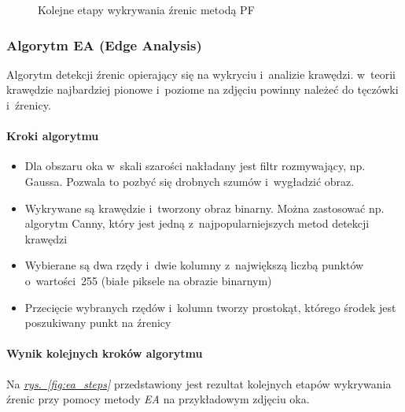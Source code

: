 \begin{figure}[!h]
\begin{center}
    \end{center}
    \caption{Kolejne etapy wykrywania źrenic metodą PF}
    \label{fig:pf_steps}
\end{figure}






\subsubsection{Algorytm EA (Edge Analysis)}

Algorytm detekcji źrenic \cite{EyePupilWebCam} opierający się na wykryciu i~analizie krawędzi. w~teorii krawędzie najbardziej pionowe i~poziome na zdjęciu powinny należeć do tęczówki i~źrenicy.

\paragraph{Kroki algorytmu}

\begin{itemize}
    \item Dla obszaru oka w~skali szarości nakładany jest filtr rozmywający, np. Gaussa. Pozwala to pozbyć się drobnych szumów i~wygładzić obraz.
    \item Wykrywane są krawędzie i~tworzony obraz binarny. Można zastosować np. algorytm Canny, który jest jedną z~najpopularniejszych metod detekcji krawędzi
    \item Wybierane są dwa rzędy i~dwie kolumny z~największą liczbą punktów o~wartości~255 (białe piksele na obrazie binarnym)
    \item Przecięcie wybranych rzędów i~kolumn tworzy prostokąt, którego środek jest poszukiwany punkt na źrenicy
\end{itemize}

\paragraph{Wynik kolejnych kroków algorytmu}
Na \hyperref[{fig:ea_steps}]{\textit{rys.~\ref{fig:ea_steps}}} przedstawiony jest rezultat kolejnych etapów wykrywania źrenic przy pomocy metody \textit{EA} na przykładowym zdjęciu oka.

